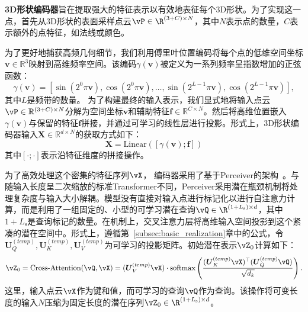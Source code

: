 \documentclass[../../book-main_zh.tex]{subfiles}
\begin{document}
\textbf{3D形状编码器}旨在提取强大的特征表示以有效地表征每个3D形状。为了实现这一点，首先从3D形状的表面采样点云$\vP \in \R^{(3 + C) \times N}$，其中$N$表示点的数量，$C$表示额外的点特征，如法线或颜色。

为了更好地捕获高频几何细节，我们利用傅里叶位置编码将每个点的低维空间坐标$\boldsymbol{v} \in \mathbb{R}^3$映射到高维频率空间。该编码$\gamma(\boldsymbol{v})$被定义为一系列频率呈指数增加的正弦函数：$$\gamma(\boldsymbol{v}) = [\sin(2^0\pi \boldsymbol{v}), \cos(2^0\pi \boldsymbol{v}), \dots, \sin(2^{L-1}\pi \boldsymbol{v}), \cos(2^{L-1}\pi \boldsymbol{v})],$$
其中$L$是频带的数量。
为了构建最终的输入表示，我们显式地将输入点云$\vP \in \mathbb{R}^{(3+C) 
\times N}$分解为空间坐标$\boldsymbol{v}$和辅助特征$\boldsymbol{f} \in \mathbb{R}^{C \times 
N}$。然后将高维位置嵌入$\gamma(\boldsymbol{v})$与保留的特征$\boldsymbol{f}$拼接，并通过可学习的线性层进行投影。形式上，3D形状编码器输入$\boldsymbol{X} \in \mathbb{R}^{d \times N}$的获取方式如下：$$\boldsymbol{X} = \text{Linear}([\gamma(\boldsymbol{v}); \boldsymbol{f}])$$其中$[\cdot ; \cdot]$表示沿特征维度的拼接操作。



为了高效处理这个密集的特征序列$\vX$，
编码器采用了基于Perceiver的架构~\cite{pmlr-v139-jaegle21a}。与随输入长度呈二次缩放的标准Transformer不同，Perceiver采用潜在瓶颈机制将处理复杂度与输入大小解耦。模型没有直接对输入点进行标记化以进行自注意力计算，而是利用了一组固定的、小型的可学习潜在查询$\vQ \in \R^{(1+L_{\mathrm{s}}) \times 
d}$，其中$1 + L_{\mathrm{s}}$是查询标记的数量。在机制上，交叉注意力层将高维输入空间投影到这个紧凑的潜在空间中。形式上，遵循第~\ref{subsec:basic_realization}章中的公式，令$\boldsymbol{U}^{(temp)}_{Q}, \boldsymbol{U}^{(temp)}_{K}, \boldsymbol{U}^{(temp)}_{V}$为可学习的投影矩阵。初始潜在表示$\vZ_0$计算如下：
$$\vZ_0 = \text{Cross-Attention}
(\vQ, \vX) = (\boldsymbol{U}^{(temp)}_{V}\vX) \cdot \text{softmax}\left(\frac{(\boldsymbol{U}^{(temp)}_{K}\vX)^\top(\boldsymbol{U}^{(temp)}_{Q}\vQ)}
{\sqrt{d_k}}\right).$$
这里，输入点云$\vX$作为键和值，而可学习的查询$\vQ$作为查询。该操作将可变长度的输入$N$压缩为固定长度的潜在序列$\vZ_0 \in \R^{(1+L_{\mathrm{s}}) \times 
d}$。
\end{document}
